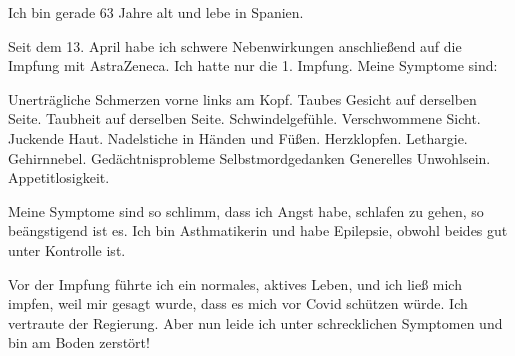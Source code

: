 Ich bin gerade 63 Jahre alt und lebe in Spanien.

Seit dem 13. April habe ich schwere Nebenwirkungen anschließend auf die Impfung
mit AstraZeneca. Ich hatte nur die 1. Impfung. Meine Symptome sind:

Unerträgliche Schmerzen vorne links am Kopf.  Taubes Gesicht auf derselben
Seite.  Taubheit auf derselben Seite.  Schwindelgefühle.  Verschwommene Sicht.
Juckende Haut.  Nadelstiche in Händen und Füßen.  Herzklopfen.  Lethargie.
Gehirnnebel.  Gedächtnisprobleme Selbstmordgedanken Generelles Unwohlsein.
Appetitlosigkeit.

Meine Symptome sind so schlimm, dass ich Angst habe, schlafen zu gehen, so
beängstigend ist es. Ich bin Asthmatikerin und habe Epilepsie, obwohl beides gut
unter Kontrolle ist.

Vor der Impfung führte ich ein normales, aktives Leben, und ich ließ mich
impfen, weil mir gesagt wurde, dass es mich vor Covid schützen würde. Ich
vertraute der Regierung. Aber nun leide ich unter schrecklichen Symptomen und
bin am Boden zerstört!
